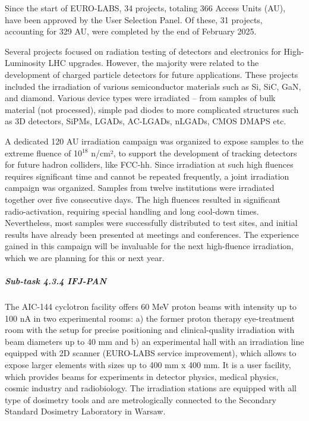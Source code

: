 Since the start of EURO-LABS, 34 projects, totaling 366 Access Units (AU), have been approved by the User Selection Panel. Of these, 31 projects, accounting for 329 AU, were completed by the end of February 2025.

Several projects focused on radiation testing of detectors and electronics for High-Luminosity LHC upgrades. However, the majority were related to the development of charged particle detectors for future applications. These projects included the irradiation of various semiconductor materials such as Si, SiC, GaN, and diamond. Various device types were irradiated – from samples of bulk material (not processed), simple pad diodes to more complicated structures such as 3D detectors, SiPMs, LGADs, AC-LGADs, nLGADs, CMOS DMAPS etc.

A dedicated 120 AU irradiation campaign was organized to expose samples to the extreme fluence of 10$^{18}$ n/cm², to support the development of tracking detectors for future hadron colliders, like FCC-hh. Since irradiation at such high fluences requires significant time and cannot be repeated frequently, a joint irradiation campaign was organized. Samples from twelve institutions were irradiated together over five consecutive days. The high fluences resulted in significant radio-activation, requiring special handling and long cool-down times. Nevertheless, most samples were successfully distributed to test sites, and initial results have already been presented at meetings and conferences. The experience gained in this campaign will be invaluable for the next high-fluence irradiation, which we are planning for this or next year.

\subparagraph{Sub-task 4.3.4 IFJ-PAN} \mbox{}

The AIC-144 cyclotron facility offers 60 MeV proton beams with intensity up to 100 nA in two experimental rooms: a) the former proton therapy eye-treatment room with the setup for precise positioning and clinical-quality irradiation with beam diameters up to 40 mm and b) an experimental hall with an irradiation line equipped with 2D scanner (EURO-LABS service improvement), which allows to expose larger elements with sizes up to 400 mm x 400 mm. It is a user facility, which provides beams for experiments in detector physics, medical physics, cosmic industry and radiobiology. The irradiation stations are equipped with all type of dosimetry tools and are metrologically connected to the Secondary Standard Dosimetry Laboratory in Warsaw.

